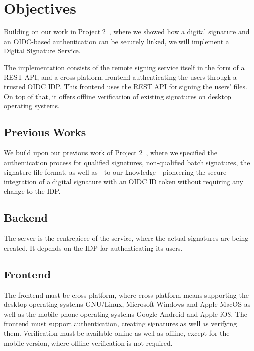 \chapter*{Objectives}
\label{ch:objectives}

Building on our work in Project 2~\cite{projekt2},
where we showed how a digital signature and an \gls{OIDC}-based authentication can be securely linked,
we will implement a Digital Signature Service.

The implementation consists of the remote signing service itself in the form of a \gls{REST} \gls{API},
and a cross-platform frontend authenticating the users through a trusted \gls{OIDC} \gls{IDP}.
This frontend uses the \gls{REST} \gls{API} for signing the users' files.
On top of that, it offers offline verification of existing signatures on desktop operating systems.

\section{Previous Works}
\label{section:previousworks}

We build upon our previous work of Project 2~\cite{projekt2}, where we specified the authentication process
for qualified signatures, non-qualified batch signatures, the signature file format,
as well as - to our knowledge - pioneering the secure integration of a digital signature with an \gls{OIDC} ID token without requiring any change to the \gls{IDP}.

\section{Backend}
\label{section:backend}

The server is the centrepiece of the service, where the actual signatures are being created.
It depends on the \gls{IDP} for authenticating its users.

\section{Frontend}
\label{section:frontend}

The frontend must be cross-platform, where cross-platform means supporting the desktop operating systems
GNU/Linux, Microsoft Windows and Apple MacOS as well as the mobile phone operating systems Google Android and Apple iOS.
The frontend must support authentication, creating signatures as well as verifying them.
Verification must be available online as well as offline, except for the mobile version, where offline verification is not required.

